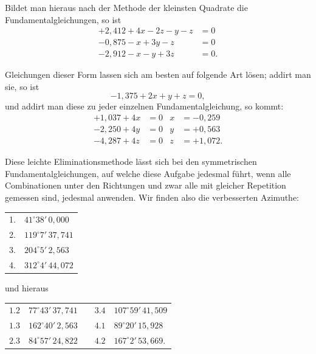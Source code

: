 \documentclass[12pt,a4paper]{article}
\theoremstyle{plain}
\theoremstyle{definition}
\theoremstyle{remark}
\begin{document}
Bildet man hieraus nach der Methode der kleinsten Quadrate die Fundamentalgleichungen, so ist
\begin{align*}
+2{,}412 + 4x - 2z - y - z &= 0\\
-0{,}875 - x + 3y - z &= 0\\
-2{,}912 - x - y + 3z &= 0.
\end{align*}

Gleichungen dieser Form lassen sich am besten auf folgende Art l\"osen; addirt man sie, so ist
\[-1{,}375 + 2x + y + z = 0,\]
und addirt man diese zu jeder einzelnen Fundamentalgleichung, so kommt:
\begin{align*}
+1{,}037 + 4x &= 0 & x &= -0{,}259\\
-2{,}250 + 4y &= 0 & y &= +0{,}563\\
-4{,}287 + 4z &= 0 & z &= +1{,}072.
\end{align*}

Diese leichte Eliminationsmethode l\"asst sich bei den symmetrischen Fundamentalgleichungen, auf welche diese Aufgabe jedesmal f\"uhrt, wenn alle Combinationen unter den Richtungen und zwar alle mit gleicher Repetition gemessen sind, jedesmal anwenden. Wir finden also die verbesserten Azimuthe:
\begin{center}
\begin{tabular}{r@{${}= {}$}l}
1. & $41^{\circ}38'\,0{,}000$\\
2. & $119^{\circ}7'\,37{,}741$\\
3. & $204^{\circ}5'\,2{,}563$\\
4. & $312^{\circ}4'\,44{,}072$
\end{tabular}
\end{center}
und hieraus
\begin{center}
\begin{tabular}{r@{${}= {}$}lcr@{${}= {}$}l}
$1.2$ & $77^{\circ}43'\,37{,}741$ & & $3.4$ & $107^{\circ}59'\,41{,}509$\\
$1.3$ & $162^{\circ}40'\,2{,}563$ & & $4.1$ & $89^{\circ}20'\,15{,}928$\\
$2.3$ & $84^{\circ}57'\,24{,}822$ & & $4.2$ & $167^{\circ}2'\,53{,}669$.
\end{tabular}
\end{center}
\end{document}

